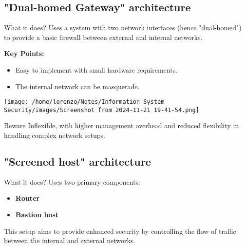 \subsection{"Dual-homed Gateway" architecture}
\vspace{0.2cm}
\begin{quotebox-yellow}{What it does?}
Uses a system with two network interfaces (hence "dual-homed") to provide a basic firewall between external and internal networks.
\end{quotebox-yellow}

\begin{minipage}{0.5\textwidth}
	\vspace{-2cm}
    \textbf{Key Points:}
    \begin{itemize}
        \item Easy to implement with small hardware requirements.
        \item The internal network can be masquerade.
    \end{itemize}
\end{minipage} 
\hfill
\begin{minipage}{0.5\textwidth}
    \centering
    \texttt{[image: /home/lorenzo/Notes/Information System Security/images/Screenshot from 2024-11-21 19-41-54.png]}
\end{minipage}
\begin{center}
    \begin{quotebox-red}{Beware}
        Inflexible, with higher management overhead and reduced flexibility in handling complex network setups.
    \end{quotebox-red}   
\end{center}

\subsection{"Screened host" architecture}
\vspace{0.2cm}
\begin{quotebox-yellow}{What it does?}
    Uses two primary components: 
    \begin{itemize}
        \item \textbf{Router}
        \item \textbf{Bastion host}
    \end{itemize}
    This setup aims to provide enhanced security by controlling the flow of traffic between the internal and external networks.
\end{quotebox-yellow}

